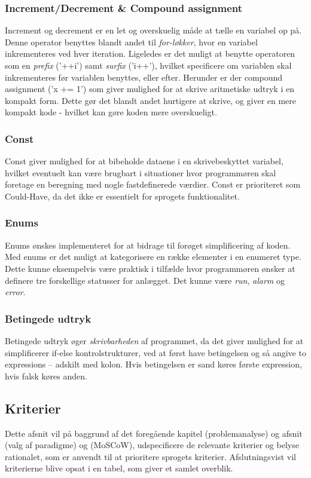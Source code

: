 \subsubsection{Increment/Decrement \& Compound assignment} 
Increment og decrement er en let og overskuelig måde at tælle en variabel op på.
Denne operator benyttes blandt andet til \textit{for-løkker}, hvor en variabel inkrementeres ved hver iteration.
Ligeledes er det muligt at benytte operatoren som en \textit{prefix} ('++i') samt \textit{surfix} ('i++'), hvilket specificere om variablen skal inkrementeres før variablen benyttes, eller efter.
Herunder er der compound assignment ('x += 1') som giver mulighed for at skrive aritmetiske udtryk i en kompakt form. Dette gør det blandt andet hurtigere at skrive, og giver en mere kompakt kode - hvilket kan gøre koden mere overskueligt.

\subsubsection{Const}
Const giver mulighed for at bibeholde dataene i en skrivebeskyttet variabel, hvilket eventuelt kan være brugbart i situationer hvor programmøren skal foretage en beregning med nogle fastdefinerede værdier. Const er prioriteret som Could-Have, da det ikke er essentielt for sprogets funktionalitet. 

\subsubsection{Enums} 
Enums ønskes implementeret for at bidrage til forøget simplificering af koden. Med enums er det muligt at kategorisere en række elementer i en enumeret type. Dette kunne eksempelvis være praktisk i tilfælde hvor programmøren ønsker at definere tre forskellige statusser for anlægget. Det kunne være \textit{run}, \textit{alarm} og \textit{error}.

\subsubsection{Betingede udtryk}
Betingede udtryk øger \textit{skrivbarheden} af programmet, da det giver mulighed for at simplificerer if-else kontrolstrukturer, ved at først have betingelsen og så angive to expressions – adskilt med kolon. Hvis betingelsen er sand køres første expression, hvis falsk køres anden. 

\subsection{Kriterier}
Dette afsnit vil på baggrund af det foregående kapitel  (problemanalyse) og afsnit  (valg af paradigme) og  (MoSCoW), udspecificere de relevante kriterier og belyse rationalet, som er anvendt til at prioritere sprogets kriterier. Afslutningsvist vil kriterierne blive opsat i en tabel, som giver et samlet overblik. 

